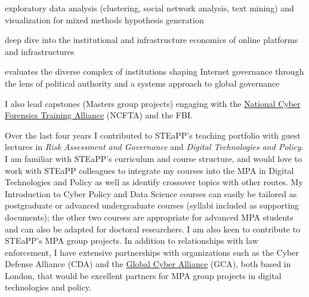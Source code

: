 \documentclass[11pt]{letter}
\begin{document}
\begin{letter}
\begin{description}[leftmargin=0.5cm]
  \item[Data Science and Visualization for Policy Analysis:] exploratory data analysis (clustering, social network analysis, text mining) and visualization for mixed methods hypothesis generation

  \item[Internet Infrastructure: Platforms and Politics:] deep dive into the institutional and infrastructure economics of online platforms and infrastructures

  \item[Advanced Cyber Policy:] evaluates the diverse complex of institutions shaping Internet governance through the lens of political authority and a systems approach to global governance
\end{description}
%
I also lead capstones (Masters group projects) engaging with the \href{https://www.ncfta.net}{National Cyber Forensics Training Alliance} (NCFTA) and the FBI.

Over the last four years I contributed to STEaPP's teaching portfolio with guest lectures in \emph{Risk Assessment and Governance} and \emph{Digital Technologies and Policy}.
%
I am familiar with STEaPP's curriculum and course structure, and would love to work with STEaPP colleagues to integrate my courses into the MPA in Digital Technologies and Policy as well as identify crossover topics with other routes.
%
My Introduction to Cyber Policy and Data Science courses can easily be tailored as postgraduate or advanced undergraduate courses (syllabi included as supporting documents); the other two courses are appropriate for advanced MPA students and can also be adapted for doctoral researchers.
%
I am also keen to contribute to STEaPP's MPA group projects.
%
In addition to relationships with law enforcement, I have extensive partnerships with organizations such as the Cyber Defense Alliance (CDA) and the \href{https://www.globalcyberalliance.org/}{Global Cyber Alliance} (GCA), both based in London, that would be excellent partners for MPA group projects in digital technologies and policy.
%


\end{letter}
\end{document}

